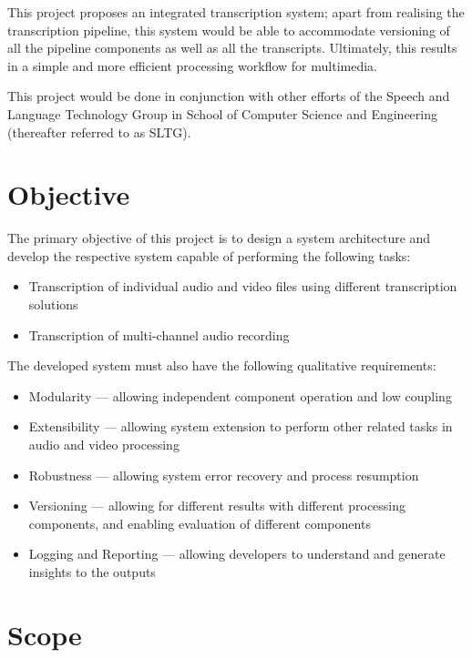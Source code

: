 This project proposes an integrated transcription system; apart from realising
the transcription pipeline, this system would be able to accommodate versioning
of all the pipeline components as well as all the transcripts. Ultimately, this
results in a simple and more efficient processing workflow for multimedia.

This project would be done in conjunction with other efforts of the Speech and
Language Technology Group in School of Computer Science and Engineering
(thereafter referred to as SLTG).

\section{Objective}

The primary objective of this project is to design a system architecture and
develop the respective system capable of performing the following tasks:

\begin{itemize}
    \item Transcription of individual audio and video files using different
    transcription solutions
    \item Transcription of multi-channel audio recording
\end{itemize}

The developed system must also have the following qualitative requirements:

\begin{itemize}
    \item Modularity --- allowing independent component operation and low coupling
    \item Extensibility --- allowing system extension to perform other related
    tasks in audio and video processing
    \item Robustness --- allowing system error recovery and process resumption
    \item Versioning --- allowing for different results with different processing
    components, and enabling evaluation of different components
    \item Logging and Reporting --- allowing developers to understand and generate
    insights to the outputs
\end{itemize}

\section{Scope}

